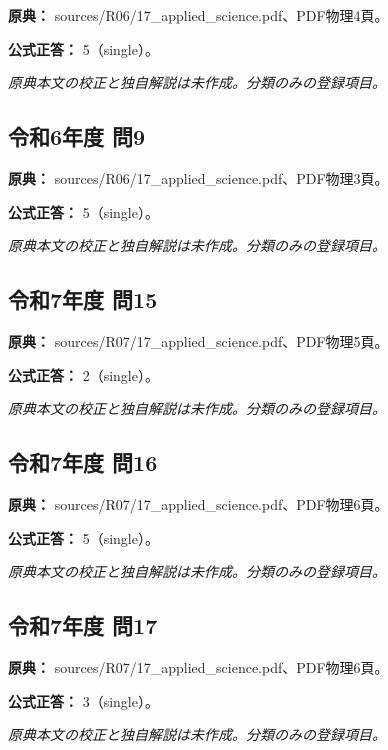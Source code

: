 \noindent\textbf{原典：} sources/R06/17\_applied\_science.pdf、PDF物理4頁。

\textbf{公式正答：} 5（single）。

\par\textit{原典本文の校正と独自解説は未作成。分類のみの登録項目。}

\subsection{令和6年度 問9}
\label{q:r06-reg-applied-09}

\noindent\textbf{原典：} sources/R06/17\_applied\_science.pdf、PDF物理3頁。

\textbf{公式正答：} 5（single）。

\par\textit{原典本文の校正と独自解説は未作成。分類のみの登録項目。}

\subsection{令和7年度 問15}
\label{q:r07-reg-applied-15}

\noindent\textbf{原典：} sources/R07/17\_applied\_science.pdf、PDF物理5頁。

\textbf{公式正答：} 2（single）。

\par\textit{原典本文の校正と独自解説は未作成。分類のみの登録項目。}

\subsection{令和7年度 問16}
\label{q:r07-reg-applied-16}

\noindent\textbf{原典：} sources/R07/17\_applied\_science.pdf、PDF物理6頁。

\textbf{公式正答：} 5（single）。

\par\textit{原典本文の校正と独自解説は未作成。分類のみの登録項目。}

\subsection{令和7年度 問17}
\label{q:r07-reg-applied-17}

\noindent\textbf{原典：} sources/R07/17\_applied\_science.pdf、PDF物理6頁。

\textbf{公式正答：} 3（single）。

\par\textit{原典本文の校正と独自解説は未作成。分類のみの登録項目。}
